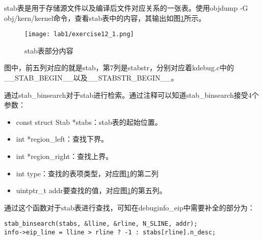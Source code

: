 \begin{exerciseSolution}{12}
    \par stab表是用于存储源文件以及编译后文件对应关系的一张表。使用objdump -G obj/kern/kernel命令，查看stab表中的内容，其输出如图\ref{fig:exercise12_1}所示。
    \begin{figure}[htb]
        \centering
        \texttt{[image: lab1/exercise12\_1.png]}
        \caption{stab表部分内容}
        \label{fig:exercise12_1}
    \end{figure}
    \par 图中，前五列对应的就是stab，第7列是stabstr，分别对应着kdebug.c中的\_\_STAB\_BEGIN\_\_以及\_\_STABSTR\_BEGIN\_\_。
    \par 通过stab\_binsearch对于stab进行检索。通过注释可以知道stab\_binsearch接受4个参数：
    \begin{itemize}
        \item const struct Stab *stabs：stab表的起始位置。
        \item int *region\_left：查找下界。
        \item int *region\_right：查找上界。
        \item int type：查找的表项类型，对应图\ref{fig:exercise12_1}的第二列
        \item uintptr\_t addr要查找的值，对应图\ref{fig:exercise12_1}的第五列。
    \end{itemize}
    \par 通过这个函数对于stab表进行查找，可知在debuginfo\_eip中需要补全的部分为：
    \begin{lstlisting}
stab_binsearch(stabs, &lline, &rline, N_SLINE, addr);
info->eip_line = lline > rline ? -1 : stabs[rline].n_desc;
    \end{lstlisting}


\end{exerciseSolution}
